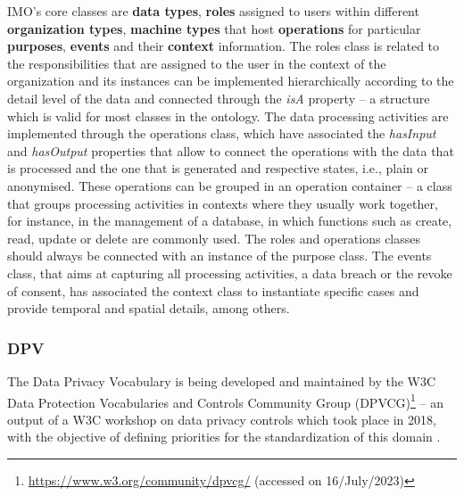 IMO's core classes are \textbf{data types}, \textbf{roles} assigned to users within different \textbf{organization types}, \textbf{machine types} that host \textbf{operations} for particular \textbf{purposes}, \textbf{events} and their \textbf{context} information.
The roles class is related to the responsibilities that are assigned to the user in the context of the organization and its instances can be implemented hierarchically according to the detail level of the data and connected through the \textit{isA} property -- a structure which is valid for most classes in the ontology. %
The data processing activities are implemented through the operations class, which have associated the \textit{hasInput} and \textit{hasOutput} properties that allow to connect the operations with the data that is processed and the one that is generated and respective states, i.e., plain or anonymised. %
These operations can be grouped in an operation container -- a class that groups processing activities in contexts where they usually work together, for instance, in the management of a database, in which functions such as create, read, update or delete are commonly used.  %
The roles and operations classes should always be connected with an instance of the purpose class.  %
The events class, that aims at capturing all processing activities, a data breach or the revoke of consent, has associated the context class to instantiate specific cases and provide temporal and spatial details, among others.  %


\subsubsection{DPV}
\label{sec:dpv}

The Data Privacy Vocabulary is being developed and maintained by the W3C Data Protection Vocabularies and Controls Community Group (DPVCG)\footnote{\url{https://www.w3.org/community/dpvcg/} (accessed on 16/July/2023)} -- an output of a W3C workshop on data privacy controls which took place in 2018, with the objective of defining priorities for the standardization of this domain \citep{bonatti_data_2018}.

